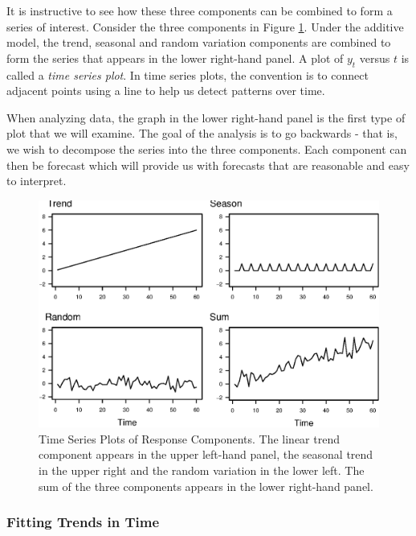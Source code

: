 

It is instructive to see how these three components can be combined
to form a series of interest. Consider the three components in
Figure \ref{F7:LinearTrend}. Under the additive model, the trend,
seasonal and random variation components are combined to form the
series that appears in the lower right-hand panel. A plot of $y_t$
versus $t$ is called a \emph{time series plot}. In time series
plots, the convention is to connect adjacent points using a line to
help us detect patterns over time.

When analyzing data, the graph in the lower right-hand panel is the
first type of plot that we will examine. The goal of the analysis is
to go backwards - that is, we wish to decompose the series into the
three components. Each component can then be forecast which will
provide us with forecasts that are reasonable and easy to interpret.


\begin{figure}[htp]
  \begin{center}
    \includegraphics[width=1\textwidth]{Chapter7Trend/Components.eps}
    \caption{\label{F7:LinearTrend} \small Time Series
Plots of Response Components. The linear trend component appears in
the upper left-hand panel, the seasonal trend in the upper right and
the random variation in the lower left. The sum of the three
components appears in the lower right-hand panel.}
  \end{center}
\end{figure}


\subsubsection*{Fitting Trends in Time}

